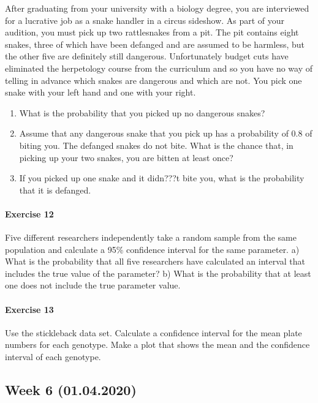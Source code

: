 \documentclass[]{article}
\providecommand{\tightlist}{%
  \setlength{\itemsep}{0pt}\setlength{\parskip}{0pt}}
\let\oldparagraph\paragraph
\renewcommand{\paragraph}[1]{\oldparagraph{#1}\mbox{}}
\begin{document}
After graduating from your university with a biology degree, you are
interviewed for a lucrative job as a snake handler in a circus sideshow.
As part of your audition, you must pick up two rattlesnakes from a pit.
The pit contains eight snakes, three of which have been defanged and are
assumed to be harmless, but the other five are definitely still
dangerous. Unfortunately budget cuts have eliminated the herpetology
course from the curriculum and so you have no way of telling in advance
which snakes are dangerous and which are not. You pick one snake with
your left hand and one with your right.

\begin{enumerate}
\def\labelenumi{\alph{enumi})}
\tightlist
\item
  What is the probability that you picked up no dangerous snakes?
\item
  Assume that any dangerous snake that you pick up has a probability of
  0.8 of biting you. The defanged snakes do not bite. What is the chance
  that, in picking up your two snakes, you are bitten at least once?
\item
  If you picked up one snake and it didn???t bite you, what is the
  probability that it is defanged.
\end{enumerate}

\hypertarget{exercise-12}{%
\paragraph{Exercise 12}\label{exercise-12}}

Five different researchers independently take a random sample from the
same population and calculate a 95\% confidence interval for the same
parameter. a) What is the probability that all five researchers have
calculated an interval that includes the true value of the parameter? b)
What is the probability that at least one does not include the true
parameter value.

\hypertarget{exercise-13}{%
\paragraph{Exercise 13}\label{exercise-13}}

Use the stickleback data set. Calculate a confidence interval for the
mean plate numbers for each genotype. Make a plot that shows the mean
and the confidence interval of each genotype.

\hypertarget{week-6-01.04.2020}{%
\subsection{Week 6 (01.04.2020)}\label{week-6-01.04.2020}}
\end{document}
